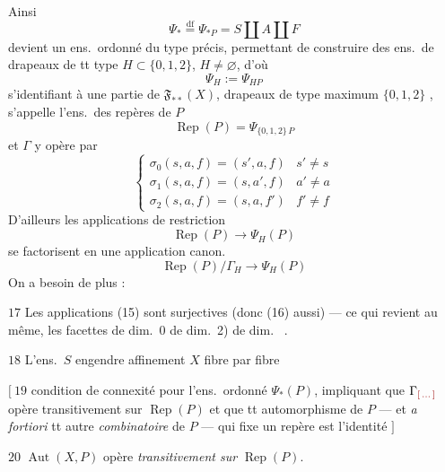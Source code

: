 \documentclass[11pt,a4paper]{article}
\begin{document}
Ainsi
\[
\boxed{\Psi_* \overset{\text{df}}{=} \Psi_{*P} = S \amalg A \amalg F} \tag{12}
\]
devient un ens.\ ordonné du type précis, permettant de construire des ens.\ de drapeaux de tt type $H \subset \{0,1,2\}$, $H \neq \varnothing$, \struck{\ill{}} d'où
\[
\boxed{\Psi_H := \Psi_{H P}} \tag{12 bis}
\]
s'identifiant à une partie de $\mathfrak{F}_{**}(X)$, \struck{\ill{}}  drapeaux de type maximum  $\{0,1,2\}$ , s'appelle l'ens.\ des repères de   $P$
\[
\operatorname{Rep}(P) = \Psi_{\{0,1,2\}\,P} \tag{13}
\]
et $\Gamma$ y opère par
\[
\begin{cases}
\sigma_0(s, a, f) = (s', a, f) & s' \neq s \\
\sigma_1(s, a, f) = (s, a', f) & a' \neq a \\
\sigma_2(s, a, f) = (s, a, f') & f' \neq f
\end{cases} \tag{14}
\]
 D'ailleurs les applications de restriction
\[
\operatorname{Rep}(P) \longrightarrow \Psi_H(P) \tag{15}
\]
se factorisent en une application canon.
\[
\operatorname{Rep}(P)/\Gamma_H \longrightarrow \Psi_H(P) \tag{16}
\]
 On a besoin de plus :

$\boxed{17}$ Les applications (15) sont surjectives (donc (16) aussi) — ce qui revient au même,  \struck{\ill{} \ill{} \ill{} \ill{} (\ill{})} \struck{\ill{} \ill{} \ill{} \ill{} \ill{} (\ill{} \ill{}} \add{\ill{} \ill{} \ill{}} les facettes \struck{\ill{}} de dim.\ 0 \ill{} de dim.\ 2) \ill{} \ill{} \ill{} de dim.\ \ill{} \ill{} \ill{}.

$\boxed{18}$ L'ens.\ $S$ engendre affinement $X$ fibre par fibre

$\bigl[\ \boxed{19}$ condition de connexité pour l'ens.\ ordonné $\Psi_*(P)$, impliquant que $\Gamma_{\ill{}}$ opère transitivement sur $\operatorname{Rep}(P)$  et que tt automorphisme de $P$ — et \emph{a fortiori} tt autre \emph{combinatoire} de $P$ — qui fixe un repère est l'identité $\bigr]$


$\boxed{20}$ $\operatorname{Aut}(X, P)$ opère \emph{transitivement sur} $\operatorname{Rep}(P)$. 
\end{document}

